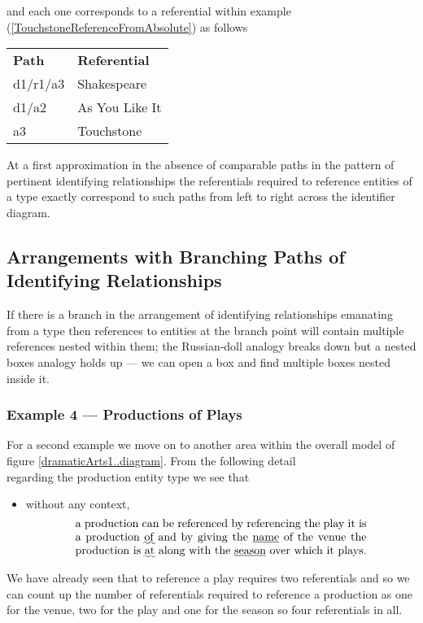 and each one corresponds to a referential within example
(\ref{TouchstoneReferenceFromAbsolute}) as follows
\begin{tabular}{l l}
\textbf{Path}     & \textbf{Referential} \\
d1/r1/a3 & Shakespeare \\
d1/a2    & As You Like It\\
a3       & Touchstone
\end{tabular}

At a first approximation in the absence of comparable paths in the pattern of pertinent identifying relationships the referentials required to reference entities of a type exactly correspond to such paths from left to right across the identifier diagram.


\subsection{Arrangements with Branching Paths of Identifying Relationships}
If there is a branch in the arrangement of identifying relationships emanating from a type then references to entities at the branch point will contain multiple  references nested within them; 
the Russian-doll analogy breaks down but a nested boxes analogy holds up --- we can open a box and find multiple boxes nested inside it. 


\subsubsection{Example 4 --- Productions of Plays}

\label{exampleReferencingProductions}

For a second example we move on to another area within the overall model of figure \ref{dramaticArts1..diagram}. From the following detail 
\begin{equation*}

\end{equation*}
regarding the production entity type  we see that
\begin{itemize}
  \item
  without any context, 
  \begin{equation} 
\label{absoluteCharacterReferencing}
\text{\parbox{9cm}{a production can be referenced by referencing the play it is a production \uwave{of} 
  and by giving the \underline{name} of the venue  the production is \uwave{at} along with the \underline{season} 
  over which it plays.}}
\end{equation}
\end{itemize}
We have already seen that to reference a play requires two referentials and so
we can count up the number of referentials required to reference a production
as one for the venue, two for the play and one for the season so four referentials in all. 

